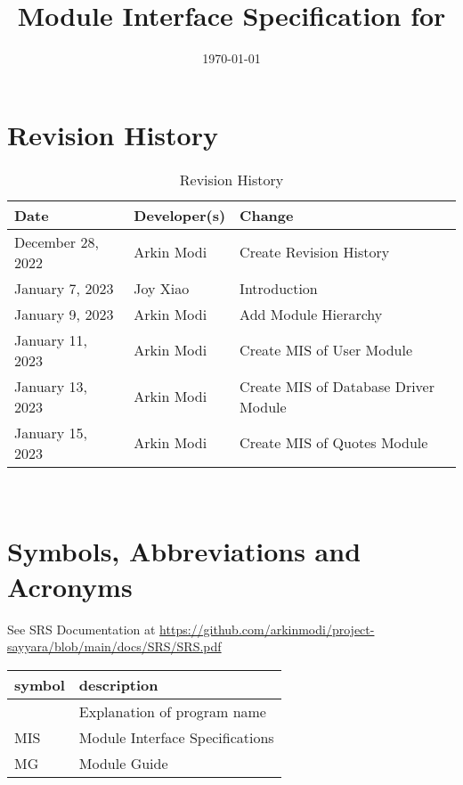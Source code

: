 \documentclass[12pt, titlepage]{article}
\begin{document}
\title{Module Interface Specification for \progname{}}

\author{\authname}

\date{\today}

\maketitle


\section{Revision History}

\begin{table}[hp]
	\caption{Revision History} \label{TblRevisionHistory}
	\begin{tabularx}{\textwidth}{llX}
		\toprule
		\textbf{Date}     & \textbf{Developer(s)} & \textbf{Change}                      \\
		\midrule
		December 28, 2022 & Arkin Modi            & Create Revision History              \\
		January 7, 2023   & Joy Xiao              & Introduction                         \\
		January 9, 2023   & Arkin Modi            & Add Module Hierarchy                 \\
		January 11, 2023  & Arkin Modi            & Create MIS of User Module            \\
		January 13, 2023  & Arkin Modi            & Create MIS of Database Driver Module \\
		January 15, 2023  & Arkin Modi            & Create MIS of Quotes Module          \\
		\bottomrule
	\end{tabularx}
\end{table}

~\newpage

\section{Symbols, Abbreviations and Acronyms}

See SRS Documentation at
\url{https://github.com/arkinmodi/project-sayyara/blob/main/docs/SRS/SRS.pdf}


\begin{tabular}{l l}
	\toprule
	\textbf{symbol} & \textbf{description}            \\
	\midrule
	\progname       & Explanation of program name     \\
	MIS             & Module Interface Specifications \\
	MG              & Module Guide                    \\
	\bottomrule
\end{tabular}
\end{document}
